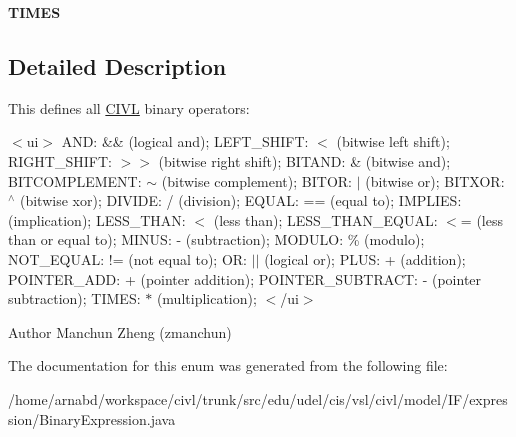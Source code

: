 \begin{DoxyCompactItemize}
\item 
\hypertarget{enumedu_1_1udel_1_1cis_1_1vsl_1_1civl_1_1model_1_1IF_1_1expression_1_1BinaryExpression_1_1BINARY__OPERATOR_aa1a5d1fdfe95e415f0b1663afd556ae1}{}{\bfseries T\+I\+M\+E\+S}\label{enumedu_1_1udel_1_1cis_1_1vsl_1_1civl_1_1model_1_1IF_1_1expression_1_1BinaryExpression_1_1BINARY__OPERATOR_aa1a5d1fdfe95e415f0b1663afd556ae1}

\end{DoxyCompactItemize}


\subsection{Detailed Description}
This defines all \hyperlink{classedu_1_1udel_1_1cis_1_1vsl_1_1civl_1_1CIVL}{C\+I\+V\+L} binary operators\+: ~\newline
 

$<$ui$>$ A\+N\+D\+: {\ttfamily \&\&} (logical and); L\+E\+F\+T\+\_\+\+S\+H\+I\+F\+T\+: {\ttfamily $<$} (bitwise left shift); R\+I\+G\+H\+T\+\_\+\+S\+H\+I\+F\+T\+: {\ttfamily $>$$>$} (bitwise right shift); B\+I\+T\+A\+N\+D\+: {\ttfamily \&} (bitwise and); B\+I\+T\+C\+O\+M\+P\+L\+E\+M\+E\+N\+T\+: {\ttfamily $\sim$} (bitwise complement); B\+I\+T\+O\+R\+: {\ttfamily $\vert$} (bitwise or);  B\+I\+T\+X\+O\+R\+: {\ttfamily $^\wedge$} (bitwise xor); D\+I\+V\+I\+D\+E\+: {\ttfamily /} (division); E\+Q\+U\+A\+L\+: {\ttfamily ==} (equal to); I\+M\+P\+L\+I\+E\+S\+: {\ttfamily } (implication); L\+E\+S\+S\+\_\+\+T\+H\+A\+N\+: {\ttfamily $<$} (less than); L\+E\+S\+S\+\_\+\+T\+H\+A\+N\+\_\+\+E\+Q\+U\+A\+L\+: {\ttfamily $<$=} (less than or equal to);  M\+I\+N\+U\+S\+: {\ttfamily -\/} (subtraction); M\+O\+D\+U\+L\+O\+: {\ttfamily \%} (modulo); N\+O\+T\+\_\+\+E\+Q\+U\+A\+L\+: {\ttfamily !=} (not equal to); O\+R\+: {\ttfamily $\vert$$\vert$} (logical or); P\+L\+U\+S\+: {\ttfamily +} (addition); P\+O\+I\+N\+T\+E\+R\+\_\+\+A\+D\+D\+: {\ttfamily +} (pointer addition); P\+O\+I\+N\+T\+E\+R\+\_\+\+S\+U\+B\+T\+R\+A\+C\+T\+: {\ttfamily -\/} (pointer subtraction); T\+I\+M\+E\+S\+: {\ttfamily $\ast$} (multiplication); $<$/ui$>$

\begin{DoxyAuthor}{Author}
Manchun Zheng (zmanchun) 
\end{DoxyAuthor}


The documentation for this enum was generated from the following file\+:\begin{DoxyCompactItemize}
\item 
/home/arnabd/workspace/civl/trunk/src/edu/udel/cis/vsl/civl/model/\+I\+F/expression/Binary\+Expression.\+java\end{DoxyCompactItemize}

